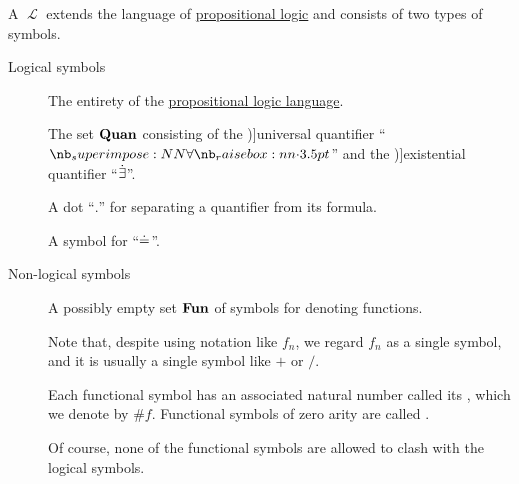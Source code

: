 \begin{definition}\label{def:first_order_language}
  A  \( \mscrL \) extends the language of \hyperref[sec:propositional_logic]{propositional logic} and consists of two types of symbols.

  \begin{description}
    \item[Logical symbols]
    \hfill
    \begin{thmenum}[series=def:first_order_language]
       The entirety of the \hyperref[sec:propositional_logic]{propositional logic language}.

       The set \( \op*{Quan} \) consisting of the \term[ru=квантор общости (\cite[61]{Эдельман1975Логика})]{universal quantifier} \enquote{\( \synforall \)} and the \term[ru=квантор существования (\cite[61]{Эдельман1975Логика})]{existential quantifier} \enquote{\( \mathord{\dot{\exists}} \)}.

       A dot \enquote{\( . \)} for separating a quantifier from its formula.

       A symbol for  \enquote{\( \doteq \)}.
    \end{thmenum}

    \item[Non-logical symbols]
    \hfill
    \begin{thmenum}[resume=def:first_order_language]
       A possibly empty  set \( \op*{Fun} \) of symbols for denoting functions.

      Note that, despite using notation like \( f_n \), we regard \( f_n \) as a single symbol, and it is usually a single symbol like \( + \) or \( / \).

      Each functional symbol has an associated natural number called its , which we denote by \( \# f \). Functional symbols of zero arity are called .

      Of course, none of the functional symbols are allowed to clash with the logical symbols.


\end{thmenum}
\end{description}
\end{definition}
